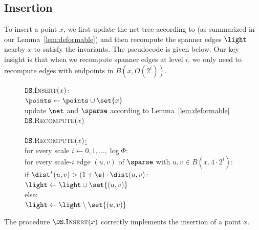 \subsection{Insertion}
To insert a point $x$, we first update the net-tree according to \cite{gao2004deformable} (as summarized in our Lemma~\ref{lem:deformable})
and then recompute the spanner edges $\light$ nearby $x$ to satisfy the invariants. The pseudocode is given below. Our key insight is that when we recompute spanner edges at level $i$, we only need to recompute edges with endpoints in $B(x, O(2^i))$.
%
\begin{figure}[h!]
\centering
\begin{algorithm}
    \ul{$\texttt{DS}.\textsc{Insert}(x)$}:\+
    \\ $\points \gets \points \cup \set{x}$
    \\ update $\net$ and $\sparse$ according to Lemma~\ref{lem:deformable}
    \\ $\texttt{DS}.\textsc{Recompute}(x)$\-
    \\    
    \\ \ul{$\texttt{DS}.\textsc{Recompute}(x)$:}\+
    \\ for every scale $i \gets 0, 1, \ldots, \log \Phi$:\+
    \\      for every scale-$i$ edge $(u,v)$ of $\sparse$ with $u,v \in B(x, 4 \cdot 2^i)$:\+
    \\          if $\dist^*(u,v) > (1+\e) \cdot \dist(u,v)$:\+
    \\  $\light \gets \light \cup \set{(u,v)}$\-
    \\ else:\+
    \\ $\light \gets \light \setminus \set{(u,v)}$\-
\end{algorithm}
\label{fig:insert-recourse}
\end{figure}
%
\begin{lemma}
\label{lem:insert-invariants}
The procedure $\DS.\textsc{Insert}(x)$ correctly implements the insertion of a point $x$.
\end{lemma}
